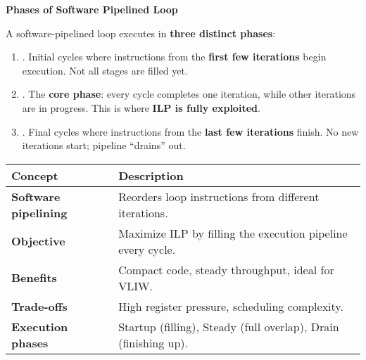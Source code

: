 \begin{flushleft}
    \textcolor{Green3}{ \textbf{Phases of Software Pipelined Loop}}
\end{flushleft}
A software-pipelined loop executes in \textbf{three distinct phases}:
\begin{enumerate}
    \item {}. Initial cycles where instructions from the \textbf{first few iterations} begin execution. Not all stages are filled yet.
    
    \item {}. The \textbf{core phase}: every cycle completes one iteration, while other iterations are in progress. This is where \textbf{ILP is fully exploited}.
    
    \item {}. Final cycles where instructions from the \textbf{last few iterations} finish. No new iterations start; pipeline ``drains'' out.
\end{enumerate}

\newpage

\begin{table}[!htp]
    \centering
    \begin{tabular}{@{} l p{22em} @{}}
        \toprule
        Concept & Description \\
        \midrule
        \textbf{Software pipelining} & Reorders loop instructions from different iterations.            \\ [.3em]
        \textbf{Objective}           & Maximize ILP by filling the execution pipeline every cycle.      \\ [.3em]
        \textbf{Benefits}            & Compact code, steady throughput, ideal for VLIW.                 \\ [.3em]
        \textbf{Trade-offs}          & High register pressure, scheduling complexity.                   \\ [.3em]
        \textbf{Execution phases}    & Startup (filling), Steady (full overlap), Drain (finishing up).  \\
        \bottomrule
    \end{tabular}
\end{table}

